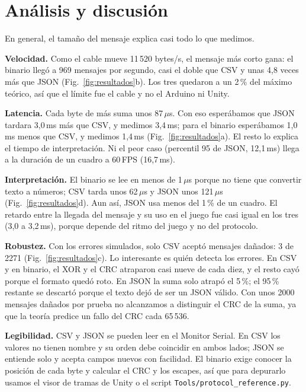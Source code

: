 \documentclass[journal]{IEEEtran}
\begin{document}
\section{Análisis y discusión}

En general, el tamaño del mensaje explica casi todo lo que medimos.

\textbf{Velocidad.} Como el cable mueve 11\,520 bytes/s, el mensaje más corto gana: el binario llegó a 969 mensajes por segundo, casi el doble que CSV y unas 4,8 veces más que JSON (Fig.~\ref{fig:resultados}b). Los tres quedaron a un 2\,\% del máximo teórico, así que el límite fue el cable y no el Arduino ni Unity.

\textbf{Latencia.} Cada byte de más suma unos 87\,$\mu$s. Con eso esperábamos que JSON tardara 3,0\,ms más que CSV, y medimos 3,4\,ms; para el binario esperábamos 1,0\,ms menos que CSV, y medimos 1,4\,ms (Fig.~\ref{fig:resultados}a). El resto lo explica el tiempo de interpretación. Ni el peor caso (percentil 95 de JSON, 12,1\,ms) llega a la duración de un cuadro a 60\,FPS (16,7\,ms).

\textbf{Interpretación.} El binario se lee en menos de 1\,$\mu$s porque no tiene que convertir texto a números; CSV tarda unos 62\,$\mu$s y JSON unos 121\,$\mu$s (Fig.~\ref{fig:resultados}d). Aun así, JSON usa menos del 1\,\% de un cuadro. El retardo entre la llegada del mensaje y su uso en el juego fue casi igual en los tres (3,0 a 3,2\,ms), porque depende del ritmo del juego y no del protocolo.

\textbf{Robustez.} Con los errores simulados, solo CSV aceptó mensajes dañados: 3 de 2271 (Fig.~\ref{fig:resultados}c). Lo interesante es quién detecta los errores. En CSV y en binario, el XOR y el CRC atraparon casi nueve de cada diez, y el resto cayó porque el formato quedó roto. En JSON la suma solo atrapó el 5\,\%; el 95\,\% restante se descartó porque el texto dejó de ser un JSON válido. Con unos 2000 mensajes dañados por prueba no alcanzamos a distinguir el CRC de la suma, ya que la teoría predice un fallo del CRC cada 65\,536.

\textbf{Legibilidad.} CSV y JSON se pueden leer en el Monitor Serial. En CSV los valores no tienen nombre y su orden debe coincidir en ambos lados; JSON se entiende solo y acepta campos nuevos con facilidad. El binario exige conocer la posición de cada byte y calcular el CRC y los escapes, así que para depurarlo usamos el visor de tramas de Unity o el script \texttt{Tools/protocol\_reference.py}.
\end{document}
